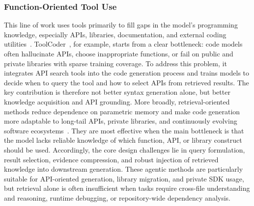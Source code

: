 \documentclass{llmxive}
\begin{document}
\subsubsection{Function-Oriented Tool Use}
This line of work uses tools primarily to fill gaps in the model's programming knowledge, especially APIs, libraries, documentation, and external coding utilities~\cite{zhang2023toolcoder,ahmed2024codeqa,zhao2025rag,li2025survey,yuan2025easytool, zou2025autotool}. ToolCoder~\cite{zhang2023toolcoder}, for example, starts from a clear bottleneck: code models often hallucinate APIs, choose inappropriate functions, or fail on public and private libraries with sparse training coverage. To address this problem, it integrates API search tools into the code generation process and trains models to decide when to query the tool and how to select APIs from retrieved results. The key contribution is therefore not better syntax generation alone, but better knowledge acquisition and API grounding. More broadly, retrieval-oriented methods reduce dependence on parametric memory and make code generation more adaptable to long-tail APIs, private libraries, and continuously evolving software ecosystems~\cite{zhao2025rag,zhou2023devil}. They are most effective when the main bottleneck is that the model lacks reliable knowledge of which function, API, or library construct should be used. Accordingly, the core design challenges lie in query formulation, result selection, evidence compression, and robust injection of retrieved knowledge into downstream generation. These agentic methods are particularly suitable for API-oriented generation, library migration, and private SDK usage, but retrieval alone is often insufficient when tasks require cross-file understanding and reasoning, runtime debugging, or repository-wide dependency analysis.
\end{document}

